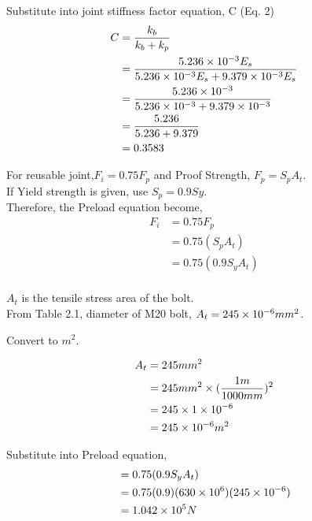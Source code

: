 \documentclass[a4paper, fleqn]{article}
\providecommand{\sci}[1]{\protect\ensuremath{\times 10^{\StrSubstitute[0]{#1}{e}{}}}}
\begin{document}
Substitute into joint stiffness factor equation, C (Eq. 2)
\begin{equation*}
    \begin{aligned}
    C&=\frac{k_b}{k_b+k_p} \\
    &=\frac{5.236\sci{e-3}E_s}{5.236\sci{e-3}E_s+9.379\sci{e-3}E_s} \\
    &=\frac{5.236\sci{e-3}}{5.236\sci{e-3}+9.379\sci{e-3}} \\
    &=\frac{5.236}{5.236+9.379} \\
    &=0.3583
    \end{aligned}
\end{equation*}

For reusable joint,$F_i=0.75F_p$ and Proof Strength, $F_p=S_pA_t$.\\
If Yield strength is given, use $S_p=0.9Sy$. \\
Therefore, the Preload equation become,
\begin{equation*}
    \begin{aligned}
        F_i&=0.75F_p\\
        &=0.75(S_pA_t)\\
        &=0.75(0.9S_yA_t)\\
    \end{aligned}
\end{equation*}

$A_t$ is the tensile stress area of the bolt.\\
From Table 2.1, diameter of M20 bolt, $A_t=245\sci{e-6}mm^2$.

Convert to $m^2$.

\begin{equation*}
    \begin{aligned}
        A_t&=245mm^2\\
        &=245mm^2\times(\frac{1m}{1000mm})^2\\
        &=245\times1\sci{e-6}\\
        &=245\sci{e-6}m^2
    \end{aligned}
\end{equation*}

Substitute into Preload equation,
\begin{equation*}
    \begin{aligned}
        &=0.75(0.9S_yA_t)\\
        &=0.75(0.9)(630\sci{e6})(245\sci{e-6})\\
        &=1.042\sci{e5}N
    \end{aligned}
\end{equation*}
\end{document}
